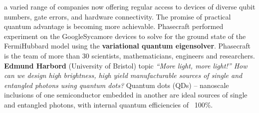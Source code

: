 \documentclass[a4paper, 12pt]{scrartcl}
\begin{document}
  a varied range of companies now offering regular access to devices of diverse qubit numbers, gate errors, 
  and hardware connectivity. The promise of practical quantum advantage is becoming more achievable. Phasecraft performed 
  experiment on the GoogleSycamore devices to solve for the ground state of the FermiHubbard model using the 
  \textbf{variational quantum eigensolver}. Phasecraft is the team of more than 30 scientists, mathematicians,
   engineers and researchers.\\
  \textbf{Edmund Harbord} (University of Bristol) topic \textit{“More light, more light!” How can we design high brightness, high yield manufacturable 
  sources of single and entangled photons using quantum dots?} Quantum dots (QDs) – nanoscale inclusions of one semiconductor embedded in another 
  are ideal sources of single and entangled photons, with internal quantum efficiencies of ~100\%. 
\end{document}
